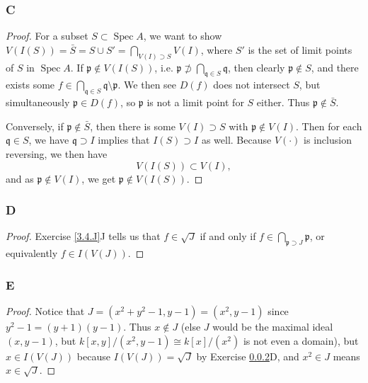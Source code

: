 \documentclass{article}
\newcommand{\frkp}{\mathfrak{p}}
\newcommand{\frkq}{\mathfrak{q}}
\DeclareMathOperator{\Spec}{\mathrm{Spec}}
\theoremstyle{definition} %
\begin{document}
\subsubsection{C}\label{3.7.C}
\begin{proof}
    For a subset $S\subset \Spec A$, we want to show $V(I(S))=\bar S = S\cup S'=\bigcap_{V(I)\supset S} V(I)$, where $S'$ is the set of limit points of $S$ in $\Spec A$. If $\frkp\notin V(I(S))$, i.e. $\frkp \not \supset \bigcap_{\frkq \in S} \frkq$, then clearly $\frkp \notin S$, and there exists some $f\in \bigcap_{\frkq \in S} \frkq \setminus \frkp$. We then see $D(f)$ does not intersect $S$, but simultaneously $\frkp \in D(f)$, so $\frkp$ is not a limit point for $S$ either. Thus $\frkp \notin \bar S$.

    Conversely, if $\frkp \notin \bar S$, then there is some $V(I) \supset S$ with $\frkp \notin V(I)$. Then for each $\frkq \in S$, we have $\frkq \supset I$ implies that $I(S) \supset I$ as well. Because $V(\cdot)$ is inclusion reversing, we then have
    \[
    V(I(S))\subset V(I),
    \]
    and as $\frkp \notin V(I)$, we get $\frkp \notin V(I(S))$.
\end{proof}
\subsubsection{D}\label{3.7.D}
\begin{proof}
    Exercise \ref{3.4.J}J tells us that $f\in \sqrt{J}$ if and only if $f\in \bigcap_{\frkp \supset J} \frkp$, or equivalently $f\in I(V(J))$.
\end{proof}
\subsubsection{E}\label{3.7.E}
\begin{proof}
    Notice that $J=(x^2+y^2-1,y-1)=(x^2, y-1)$ since $y^2-1=(y+1)(y-1)$. Thus $x\notin J$ (else $J$ would be the maximal ideal $(x,y-1)$, but $k[x,y]/(x^2,y-1) \cong k[x]/(x^2)$ is not even a domain), but $x\in I(V(J))$ because $I(V(J))=\sqrt{J}$ by Exercise \ref{3.7.D}D, and $x^2 \in J$ means $x\in \sqrt{J}$.
\end{proof}
\end{document}
